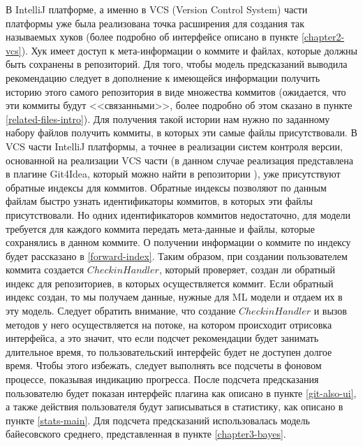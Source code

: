 В IntelliJ платформе, а именно в VCS (Version Control System) части платформы уже была реализована точка расширения для создания так называемых хуков (более подробно об интерфейсе описано в пункте \ref{chapter2-vcs}). Хук имеет доступ к мета-информации о коммите и файлах, которые должны быть сохранены в репозиторий. Для того, чтобы модель предсказаний выводила рекомендацию следует в дополнение к имеющейся информации получить историю этого самого репозитория в виде множества коммитов (ожидается, что эти коммиты будут <<связанными>>, более подробно об этом сказано в пункте \ref{related-files-intro}). Для получения такой истории нам нужно по заданному набору файлов получить коммиты, в которых эти самые файлы присутствовали. В VCS части IntelliJ платформы, а точнее в реализации систем контроля версии, основанной на реализации VCS части (в данном случае реализация представлена в плагине Git4Idea, который можно найти в репозитории \cite{ij-community}), уже присутствуют обратные индексы для коммитов. Обратные индексы позволяют по данным файлам быстро узнать идентификаторы коммитов, в которых эти файлы присутствовали. Но одних идентификаторов коммитов недостаточно, для модели требуется для каждого коммита передать мета-данные и файлы, которые сохранялись в данном коммите. О получении информации о коммите по индексу будет рассказано в \ref{forward-index}. Таким образом, при создании пользователем коммита создается $CheckinHandler$, который проверяет, создан ли обратный индекс для репозиториев, в которых осуществляется коммит. Если обратный индекс создан, то мы получаем данные, нужные для ML модели и отдаем их в эту модель. Следует обратить внимание, что создание $CheckinHandler$ и вызов методов у него осуществляется на потоке, на котором происходит отрисовка интерфейса, а это значит, что если подсчет рекомендации будет занимать длительное время, то пользовательский интерфейс будет не доступен долгое время. Чтобы этого избежать, следует выполнять все подсчеты в фоновом процессе, показывая индикацию прогресса. После подсчета предсказания пользователю будет показан интерфейс плагина как описано в пункте \ref{git-also-ui}, а также действия пользователя будут записываться в статистику, как описано в пункте \ref{stats-main}. Для подсчета предсказаний использовалась модель байесовского среднего, представленная в пункте \ref{chapter3-bayes}.

